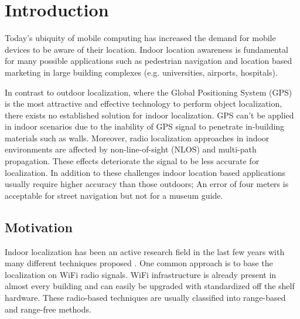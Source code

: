 
\chapter{Introduction} %

\label{Chapter1} %


\newcommand{\keyword}[1]{\textbf{#1}}
\newcommand{\tabhead}[1]{\textbf{#1}}
\newcommand{\code}[1]{\texttt{#1}}
\newcommand{\file}[1]{\texttt{\bfseries#1}}
\newcommand{\option}[1]{\texttt{\itshape#1}}


Today's ubiquity of mobile computing has increased the demand for mobile devices to be aware of their location. Indoor location awareness is fundamental for many possible applications such as pedestrian navigation and location based marketing in large building complexes (e.g. universities, airports, hospitals).

In contrast to outdoor localization, where the Global Positioning System (GPS) is the most attractive and effective technology to perform object localization, there exists no established solution for indoor localization. GPS can't be applied in indoor scenarios due to the inability of GPS signal to penetrate in-building materials such  as walls. Moreover, radio localization approaches in indoor environments are affected by non-line-of-sight (NLOS) and multi-path  propagation. These effects deteriorate the signal to be less accurate for localization\cite{JoseMaster,multipathEffects}. In addition to these challenges indoor location based applications usually require higher accuracy than those outdoors; An error of four meters is acceptable for street navigation but not for a museum guide.

\section{Motivation}

Indoor localization has been an active research field in the last few years with many different techniques proposed \cite{surveyIndoorTechniques,surveyWirelessPersonal}. One common approach is to base the localization on WiFi radio signals. WiFi infrastructure is already present in almost every building and can easily be upgraded with standardized off the shelf hardware. These radio-based techniques are usually classified into range-based and range-free methods\cite{FineGrainedIndoorTracking}.

